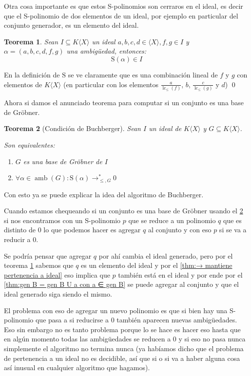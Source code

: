 \documentclass[12pt]{report}
\theoremstyle{customstyle}
\newtheorem{theorem}{Teorema}[chapter]
\renewenvironment{proof}[1][\proofname]{{\bfseries #1: }}{\qed} %
\theoremstyle{factstyle}
\DeclareMathOperator{\lc}{lc}
\DeclareMathOperator{\amb}{amb}
\renewcommand{\S}{\text{S}}
\begin{document}
Otra cosa importante es que estos S-polinomios son cerraros en el ideal, es decir que el S-polinomio de dos elementos de un ideal, por ejemplo en particular del conjunto generador, es un elemento del ideal.

\begin{theorem}\label{thm:S es cerrado en ideal}
  Sean $I ⊆ K⟨X⟩$ un ideal $a, b, c, d ∈ ⟨X⟩, f, g ∈ I$ y $α = (a, b, c, d, f, g)$ una ambigüedad, entonces:
  \[ \S(α) ∈ I \]
\end{theorem}
  \begin{proof}
  En la definición de $\S$ se ve claramente que es una combinación lineal de $f$ y $g$ con elementos de $K⟨X⟩$ (en particular con los elementos $\frac{a}{\lc_≤{(f)}}$, $b$, $\frac{c}{\lc_≤{(g)}}$ y $d$)
\end{proof}

Ahora si damos el anunciado teorema para computar si un conjunto es una base de Gröbner.

\begin{theorem}[Condición de Buchberger]\label{thm:condición de Buchberger)}
  Sean $I$ un ideal de $K⟨X⟩$ y $G ⊆ K⟨X⟩$.

  Son equivalentes:
  \begin{enumerate}
    \item $G$ es una base de Gröbner de $I$
    \item $∀α ∈ \amb(G) : \S(α) →^*_{≤, G} 0$
  \end{enumerate}
\end{theorem}

Con esto ya se puede explicar la idea del algoritmo de Buchberger.

Cuando estamos chequeando si un conjunto es una base de Gröbner usando el \cref{thm:condición de Buchberger)} si nos encontramos con un S-polinomio $p$ que se reduce a un polinomio $q$ que es distinto de $0$ lo que podemos hacer es agregar $q$ al conjunto y con eso $p$ si se va a reducir a $0$.

Se podría pensar que agregar $q$ por ahí cambia el ideal generado, pero por el teorema \cref{thm:S es cerrado en ideal} sabemos que $q$ es un elemento del ideal y por el \cref{thm:→ mantiene pertenencia a ideal} eso implica que $p$ también está en el ideal y por ende por el \cref{thm:gen B = gen B U a con a ∈ gen B} se puede agregar al conjunto y que el ideal generado siga siendo el mismo.

El problema con eso de agregar un nuevo polinomio es que si bien hay una S-polinomio que pasa a si reducirse a $0$ también aparecen nuevas ambigüedades. Eso sin embargo no es tanto problema porque lo se hace es hacer eso hasta que en algún momento todas las ambigüedades se reducen a $0$ y si eso no pasa nunca simplemente el algoritmo no termina nunca (ya habíamos dicho que el problema de pertenencia a un ideal no es decidible, así que si o si va a haber alguna cosa así inusual en cualquier algoritmo que hagamos).
\end{document}
